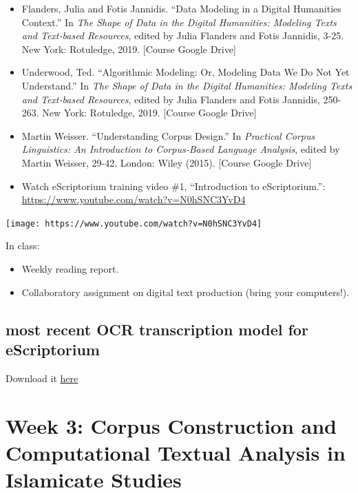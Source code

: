 \documentclass[
]{book}
\providecommand{\tightlist}{%
  \setlength{\itemsep}{0pt}\setlength{\parskip}{0pt}}
\begin{document}
\begin{itemize}
\tightlist
\item
  Flanders, Julia and Fotis Jannidis. ``Data Modeling in a Digital Humanities Context.'' In \emph{The Shape of Data in the Digital Humanities: Modeling Texts and Text-based Resources}, edited by Julia Flanders and Fotis Jannidis, 3-25. New York: Rotuledge, 2019. {[}Course Google Drive{]}\\
\item
  Underwood, Ted. ``Algorithmic Modeling: Or, Modeling Data We Do Not Yet Understand.'' In \emph{The Shape of Data in the Digital Humanities: Modeling Texts and Text-based Resources}, edited by Julia Flanders and Fotis Jannidis, 250-263. New York: Rotuledge, 2019. {[}Course Google Drive{]}
\item
  Martin Weisser. ``Understanding Corpus Design.'' In \emph{Practical Corpus Linguistics: An Introduction to Corpus‐Based Language Analysis}, edited by Martin Weisser, 29-42. London: Wiley (2015). {[}Course Google Drive{]}
\item
  Watch eScriptorium training video \#1, ``Introduction to eScriptorium.'': \url{https://www.youtube.com/watch?v=N0hSNC3YvD4}
\end{itemize}

\texttt{[image: https://www.youtube.com/watch?v=N0hSNC3YvD4]}

In class:

\begin{itemize}
\tightlist
\item
  Weekly reading report.
\item
  Collaboratory assignment on digital text production (bring your computers!).
\end{itemize}

\hypertarget{most-recent-ocr-transcription-model-for-escriptorium}{%
\section{most recent OCR transcription model for eScriptorium}\label{most-recent-ocr-transcription-model-for-escriptorium}}

Download it \href{./2021IslamicateWorldCourse_files/arabPers-WithDiffTypefaces.mlmodel}{here}

\hypertarget{week-3-corpus-construction-and-computational-textual-analysis-in-islamicate-studies-1}{%
\chapter{Week 3: Corpus Construction and Computational Textual Analysis in Islamicate Studies}\label{week-3-corpus-construction-and-computational-textual-analysis-in-islamicate-studies-1}}
\end{document}

